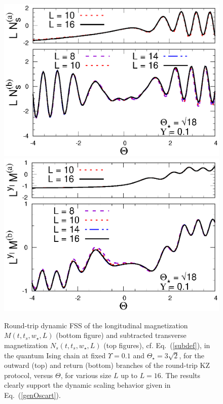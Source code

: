 \begin{figure}[!htb]
\centering
  \includegraphics[width=0.65\columnwidth]{imm/headIQMY01ThZ.eps}
  \includegraphics[width=0.65\columnwidth]{imm/headIQMY01ThX.eps}
  \caption{ Round-trip dynamic FSS of the longitudinal magnetization
    $M(t,t_s,w_\star,L)$ (bottom figure) and subtracted transverse
    magnetization $N_s(t,t_s,w_\star,L)$ (top figures),
    cf. Eq.~(\ref{subdef}), in the quantum Ising chain at fixed
    $\Upsilon=0.1$ and $\Theta_\star = 3\sqrt{2}$, for the outward
    (top) and return (bottom) branches of the round-trip KZ protocol,
    versus $\Theta$, for various size $L$ up to $L=16$.  The results
    clearly support the dynamic scaling behavior given in
    Eq.~(\ref{genOscart}).}
  \label{roundtripMN}
\end{figure}


